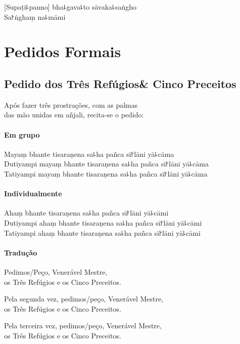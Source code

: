 \documentclass[
  babelLanguage=portuguese,
  final,
  showtrims,
]{chantingbook}
\begin{document}
[Supaṭi꜕panno] bha꜕gava꜕to sāvaka꜕saṅgho\\
Sa꜓ṅghaṃ na꜕māmi

\part{Pedidos Formais}

\artopttrue

\clearpage
\chapter[Três Refúgios \& Cinco Preceitos]{Pedido dos Três Refúgios\newline \& Cinco Preceitos}

\begin{instruction}
  Após fazer três prostrações, com as palmas\\
  das mão unidas em añjali, recita-se o pedido:
\end{instruction}

\subsection{Em grupo}

Mayaṃ bhante tisaraṇena sa꜕ha pañca sī꜓lāni yā꜕cāma\\
Dutiyampi mayaṃ bhante tisaraṇena sa꜕ha pañca sī꜓lāni yā꜕cāma\\
Tatiyampi mayaṃ bhante tisaraṇena sa꜕ha pañca sī꜓lāni yā꜕cāma

\subsection{Individualmente}

Ahaṃ bhante tisaraṇena sa꜕ha pañca sī꜓lāni yā꜕cāmi\\
Dutiyampi ahaṃ bhante tisaraṇena sa꜕ha pañca sī꜓lāni yā꜕cāmi\\
Tatiyampi ahaṃ bhante tisaraṇena sa꜕ha pañca sī꜓lāni yā꜕cāmi

\subsection{Tradução}

\begin{english}
  Pedimos/Peço, Venerável Mestre,\\
  \vin os Três Refúgios e os Cinco Preceitos.

  Pela segunda vez, pedimos/peço, Venerável Mestre,\\
  \vin os Três Refúgios e os Cinco Preceitos.

  Pela terceira vez, pedimos/peço, Venerável Mestre,\\
  \vin os Três Refúgios e os Cinco Preceitos.
\end{english}
\end{document}
